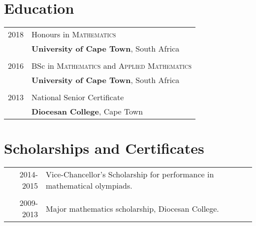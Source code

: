 \documentclass[a4paper,10pt]{article}
\begin{document}
\section{Education}
\begin{tabular}{rl}	
 2018 & Honours in \textsc{Mathematics}\\&\textbf{University of Cape Town}, South Africa\\&\\

2016 & BSc in \textsc{Mathematics} and \textsc{Applied Mathematics}\\&\textbf{University of Cape Town}, South Africa\\&\\

2013 & National Senior Certificate \\&\normalsize\textbf{Diocesan College}, Cape Town\\
\end{tabular}

\section{Scholarships and Certificates}
\begin{tabular}{rl}
2014-2015 & Vice-Chancellor's Scholarship for performance in mathematical olympiads.\\&\\
 2009-2013 & Major mathematics scholarship, Diocesan College.\\
\end{tabular}
\end{document}
